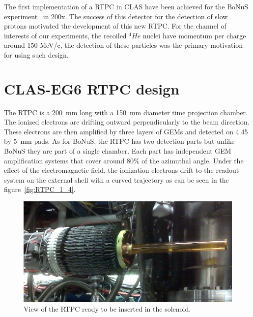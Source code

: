 \documentclass[aps,prl,twocolumn,showpacs,superscriptaddress,groupedaddress]{revtex4}
\begin{document}
The first implementation of a RTPC in CLAS have been achieved for the BoNuS 
experiment~\cite{BONUS} in 200x. The success of this detector for the detection 
of slow protons motivated the development of this new RTPC. For the channel of 
interests of our experiments, the recoiled $^{4}He$ nuclei have momentum per 
charge around 150 MeV/c, the detection of these particles was the primary 
motivation for using such design. 

 
\section{CLAS-EG6 RTPC design} \label{sec_design}
The RTPC is a 200~mm long with a 150~mm diameter time projection chamber. The 
ionized electrons are drifting outward perpendicularly to the beam direction.  
These electrons are then amplified by three layers of GEMs and detected on 4.45 
by 5~mm pads. As for BoNuS, the RTPC has two detection parts but unlike BoNuS 
they are part of a single chamber. Each part has independent GEM amplification 
systems that cover around 80\% of the azimuthal angle. Under the effect of the 
electromagnetic field, the ionization electrons drift to the readout system on 
the external shell with a curved trajectory as can be seen in the 
figure~\ref{fig:RTPC_1_4}.

\begin{figure}[tb]
\centering
\includegraphics[scale=0.19]{fig/RTPC_exp.png}
\caption[]{\small\sf View of the RTPC ready to be inserted in the solenoid. } 
\label{fig:RTPC2}
\end{figure}
\end{document}
